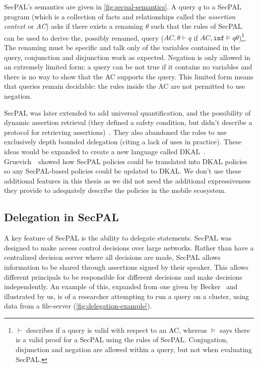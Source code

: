 \documentclass[thesis.tex]{subfiles}
\begin{document}
SecPAL's semantics are given in \autoref{fig:secpal-semantics}.  A
query $q$ to a SecPAL program (which is a collection of facts and
relationships called the \emph{assertion context} or \emph{AC}) asks
if there exists a renaming $\theta$ such that the rules of SecPAL can
be used to derive the, possibly renamed, query ($AC,\theta \vdash q$
if $AC,\texttt{inf} \models q\theta$)\footnote{$\vdash$ describes if a query
  is valid with respect to an AC, whereas $\models$ says there is a
  valid proof for a SecPAL using the rules of SecPAL.  Conjugation,
  disjunction and negation are allowed within a query, but not when
  evaluating SecPAL.}.  The renaming must be specific and talk only of
the variables contained in the query, conjunction and disjunction work
as expected.  Negation is only allowed in an extremely limited form: a
query can be not true if it contains no variables and there is no way
to show that the AC supports the query.  This limited form means that
queries remain decidable: the rules inside the AC are not permitted to
use negation.

SecPAL was later extended to add universal quantification, and the possibility
of dynamic assertion retrieval (they defined a safety condition, but didn't
describe a protocol for retrieving
assertions)~\cite{moritz_y_becker_secpal:_2009}. They also abandoned the roles
to use exclusively depth bounded delegation (citing a lack of uses in practice).
These ideas would be expanded to create a new language called
DKAL~\cite{gurevich_dkal:_2008}. Gruevich~\etal~showed how SecPAL policies could
be translated into DKAL policies~\cite{gurevich_dkal:_2008} so any SecPAL-based
policies could be updated to DKAL. We don't use these additional features in
this thesis as we did not need the additional expressiveness they provide to
adequately describe the policies in the mobile ecosystem.

\subsection{Delegation in SecPAL}

A key feature of SecPAL is the ability to delegate statements. SecPAL was
designed to make access control decisions over large networks. Rather than have
a centralized decision server where all decisions are made, SecPAL allows
information to be shared through assertions signed by their speaker. This allows
different principals to be responsible for different decisions and make
decisions independently. An example of this, expanded from one given by
Becker~\cite{becker_secpal:_2006} and illustrated by us, is of a
researcher attempting to run a query on a cluster, using data from a file-server
(\autoref{fig:delegation-example}).
\end{document}
